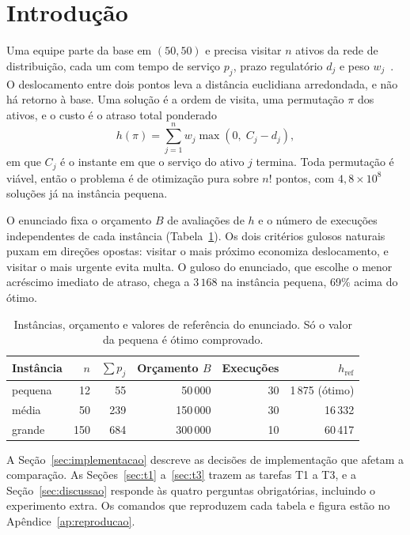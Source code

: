 \section{Introdução}
\label{sec:introducao}

Uma equipe parte da base em $(50, 50)$ e precisa visitar $n$ ativos da rede de distribuição, cada um com tempo de serviço $p_j$, prazo regulatório $d_j$ e peso $w_j$~\citep{enunciado2026tp2}.
O deslocamento entre dois pontos leva a distância euclidiana arredondada, e não há retorno à base.
Uma solução é a ordem de visita, uma permutação $\pi$ dos ativos, e o custo é o atraso total ponderado
\begin{equation}
  h(\pi) = \sum_{j=1}^{n} w_j \max\left(0,\; C_j - d_j\right),
  \label{eq:custo}
\end{equation}
em que $C_j$ é o instante em que o serviço do ativo $j$ termina.
Toda permutação é viável, então o problema é de otimização pura sobre $n!$ pontos, com $4{,}8 \times 10^{8}$ soluções já na instância pequena.

O enunciado fixa o orçamento $B$ de avaliações de $h$ e o número de execuções independentes de cada instância (Tabela~\ref{tab:instancias}).
Os dois critérios gulosos naturais puxam em direções opostas: visitar o mais próximo economiza deslocamento, e visitar o mais urgente evita multa.
O guloso do enunciado, que escolhe o menor acréscimo imediato de atraso, chega a $3\,168$ na instância pequena, 69\% acima do ótimo.

\begin{table}[tbp]
  \centering\small
  \caption{Instâncias, orçamento e valores de referência do enunciado. Só o valor da pequena é ótimo comprovado.}
  \label{tab:instancias}
  \begin{tabular}{lrrrrr}
    \toprule
    Instância & $n$ & $\sum p_j$ & Orçamento $B$ & Execuções & $h_{\mathrm{ref}}$ \\
    \midrule
    pequena & 12 & 55 & 50\,000 & 30 & 1\,875 (ótimo) \\
    média & 50 & 239 & 150\,000 & 30 & 16\,332 \\
    grande & 150 & 684 & 300\,000 & 10 & 60\,417 \\
    \bottomrule
  \end{tabular}
\end{table}

A Seção~\ref{sec:implementacao} descreve as decisões de implementação que afetam a comparação.
As Seções~\ref{sec:t1} a~\ref{sec:t3} trazem as tarefas T1 a T3, e a Seção~\ref{sec:discussao} responde às quatro perguntas obrigatórias, incluindo o experimento extra.
Os comandos que reproduzem cada tabela e figura estão no Apêndice~\ref{ap:reproducao}.
